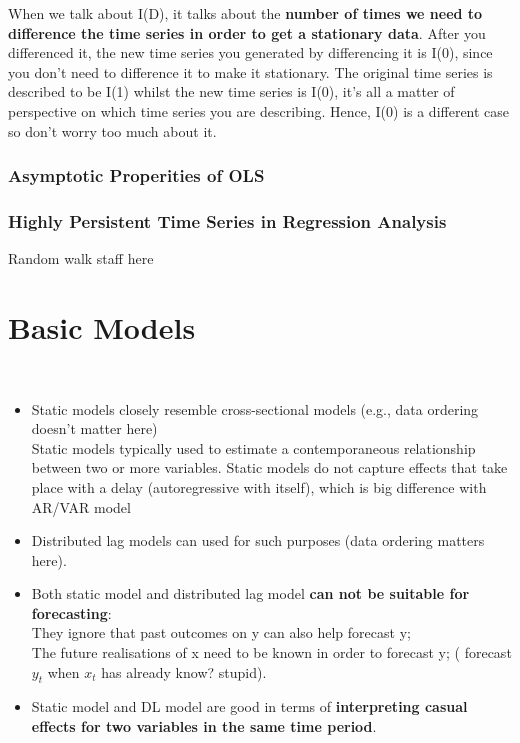 \documentclass[12pt]{article}
\begin{document}
When we talk about I(D), it talks about the \textbf{number of times we need to difference the time series in order to get a stationary data}.
After you differenced it, the new time series you generated by differencing it is I(0), since you don't need to difference it to make it stationary. The original time series is described to be I(1) whilst the new time series is I(0), it's all a matter of perspective on which time series you are describing. Hence, I(0) is a different case so don't worry too much about it. 
\\


{\color{RoyalBlue}
\subsubsection{Asymptotic Properities of OLS}}


{\color{RoyalBlue}
\subsubsection{Highly Persistent Time Series in Regression Analysis}}
Random walk staff here


\newpage
{\color{RoyalBlue}
\section{Basic Models}}
\noindent
\color{purple} \\
\color{black}
\begin{itemize}
\item
Static models closely resemble cross-sectional models (e.g., data ordering doesn’t matter here)
\\
Static models typically used to estimate a contemporaneous relationship between two or more variables. Static models do not capture effects that take place with a delay (autoregressive with itself), which is big difference with AR/VAR model
\item
Distributed lag models can used for such purposes (data ordering matters here).
\item
Both static model and distributed lag model \textbf{can not be suitable for forecasting}:\\
They ignore that past outcomes on y can also help forecast y; \\
The future realisations of x need to be known in order to forecast y; ( forecast $y_t$ when $x_t$ has already know? stupid). 
\item
Static model and DL model are good in terms of \textbf{interpreting casual effects for two variables in the same time period}. 
\end{itemize}
\end{document}
